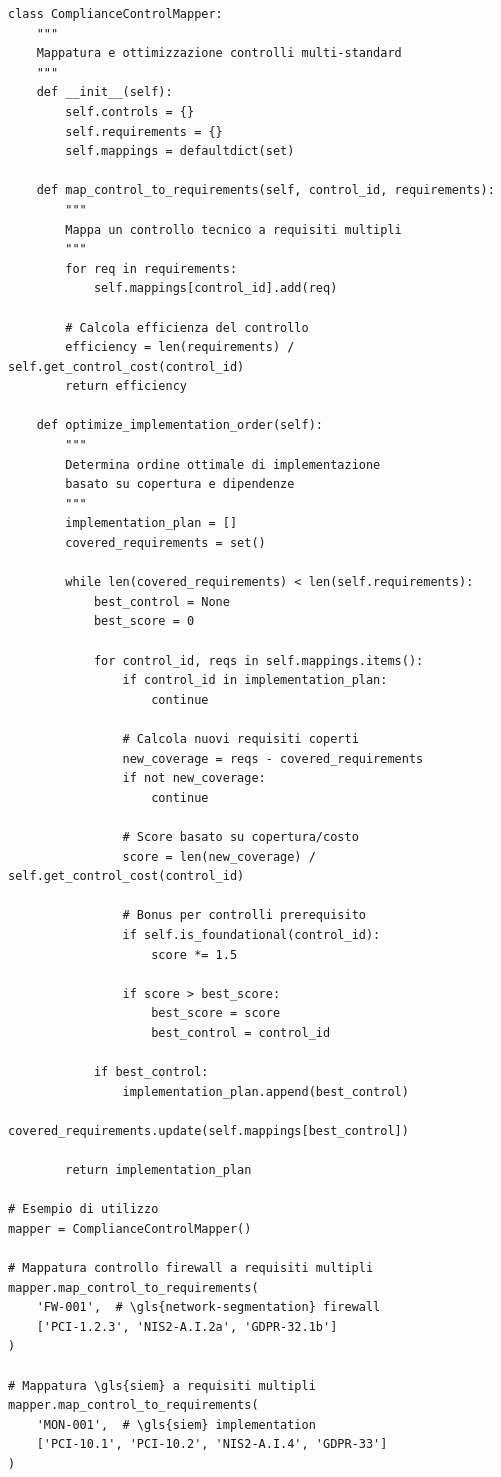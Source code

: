 \begin{lstlisting}[caption={Framework Python per Mappatura Controlli},label={lst:control_mapping}]
class ComplianceControlMapper:
    """
    Mappatura e ottimizzazione controlli multi-standard
    """
    def __init__(self):
        self.controls = {}
        self.requirements = {}
        self.mappings = defaultdict(set)
    
    def map_control_to_requirements(self, control_id, requirements):
        """
        Mappa un controllo tecnico a requisiti multipli
        """
        for req in requirements:
            self.mappings[control_id].add(req)
            
        # Calcola efficienza del controllo
        efficiency = len(requirements) / self.get_control_cost(control_id)
        return efficiency
    
    def optimize_implementation_order(self):
        """
        Determina ordine ottimale di implementazione
        basato su copertura e dipendenze
        """
        implementation_plan = []
        covered_requirements = set()
        
        while len(covered_requirements) < len(self.requirements):
            best_control = None
            best_score = 0
            
            for control_id, reqs in self.mappings.items():
                if control_id in implementation_plan:
                    continue
                    
                # Calcola nuovi requisiti coperti
                new_coverage = reqs - covered_requirements
                if not new_coverage:
                    continue
                
                # Score basato su copertura/costo
                score = len(new_coverage) / self.get_control_cost(control_id)
                
                # Bonus per controlli prerequisito
                if self.is_foundational(control_id):
                    score *= 1.5
                    
                if score > best_score:
                    best_score = score
                    best_control = control_id
            
            if best_control:
                implementation_plan.append(best_control)
                covered_requirements.update(self.mappings[best_control])
        
        return implementation_plan

# Esempio di utilizzo
mapper = ComplianceControlMapper()

# Mappatura controllo firewall a requisiti multipli
mapper.map_control_to_requirements(
    'FW-001',  # \gls{network-segmentation} firewall
    ['PCI-1.2.3', 'NIS2-A.I.2a', 'GDPR-32.1b']
)

# Mappatura \gls{siem} a requisiti multipli  
mapper.map_control_to_requirements(
    'MON-001',  # \gls{siem} implementation
    ['PCI-10.1', 'PCI-10.2', 'NIS2-A.I.4', 'GDPR-33']
)
\end{lstlisting}

